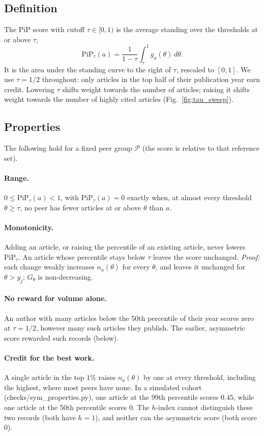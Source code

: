 \subsection*{Definition}
The PiP score with cutoff $\tau \in [0, 1)$ is the average standing over the thresholds at or above $\tau$,
\begin{equation}
\mathrm{PiP}_\tau(a) = \frac{1}{1-\tau} \int_\tau^1 g_a(\theta)\, d\theta .
\end{equation}
It is the area under the standing curve to the right of $\tau$, rescaled to $[0,1]$. We use $\tau = 1/2$ throughout:
only articles in the top half of their publication year earn credit. Lowering $\tau$ shifts weight towards the number of
articles; raising it shifts weight towards the number of highly cited articles (Fig.~\ref{fig:tau_sweep}).

\subsection*{Properties}
The following hold for a fixed peer group $\mathcal{P}$ (the score is relative to that reference set).

\paragraph{Range.} $0 \le \mathrm{PiP}_\tau(a) < 1$, with $\mathrm{PiP}_\tau(a) = 0$ exactly when, at almost every threshold
$\theta \ge \tau$, no peer has fewer articles at or above $\theta$ than $a$.

\paragraph{Monotonicity.} Adding an article, or raising the percentile of an existing article, never lowers
$\mathrm{PiP}_\tau$. An article whose percentile stays below $\tau$ leaves the score unchanged. \emph{Proof:} each change
weakly increases $n_a(\theta)$ for every $\theta$, and leaves it unchanged for $\theta > y_j$; $G_\theta$ is
non-decreasing.

\paragraph{No reward for volume alone.} An author with many articles below the 50th percentile of their year scores zero
at $\tau = 1/2$, however many such articles they publish. The earlier, asymmetric score rewarded such records (below).

\paragraph{Credit for the best work.} A single article in the top $1\%$ raises $n_a(\theta)$ by one at every threshold,
including the highest, where most peers have none. In a simulated cohort (checks/sym\_properties.py), one article at the
99th percentile scores $0.45$, while one article at the 50th percentile scores $0$. The $h$-index cannot distinguish
these two records (both have $h = 1$), and neither can the asymmetric score (both score $0$).

